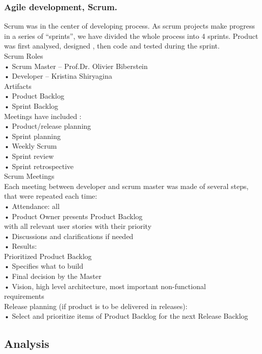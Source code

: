 \documentclass{scrartcl}
\begin{document}
\subsubsection{ Agile development, Scrum.} 
Scrum was in the center of developing process.
As scrum projects make progress in a series of “sprints”, we have divided the whole process into
4 sprints. Product was first analysed, designed , then code and tested during the sprint. \\
Scrum
Roles \\
	•	Scrum Master – Prof.Dr. Olivier Biberstein\\
	•	Developer – Kristina Shiryagina\\
 Artifacts \\
	•	Product Backlog\\
	•	Sprint Backlog\\
 Meetings have included :\\
	•	Product/release planning\\
	•	Sprint planning\\
	•	Weekly Scrum\\
	•	Sprint review\\
	•	Sprint retrospective\\
Scrum Meetings \\
Each meeting between developer and scrum master was made of several steps, that were repeated each time:\\
	•	Attendance: all\\
	•	Product Owner presents Product Backlog\\
with all relevant user stories with their priority\\
	•	Discussions and clarifications if needed\\
	•	Results:\\
Prioritized Product Backlog\\
	•	Specifies what to build\\
	•	Final decision by the Master\\
	•	Vision, high level architecture, most important non-functional\\
requirements\\
Release planning (if product is to be delivered in releases):\\
	•	Select and prioritize items of Product Backlog for the next Release Backlog\\





\subsection{Analysis} 	 
\end{document}
